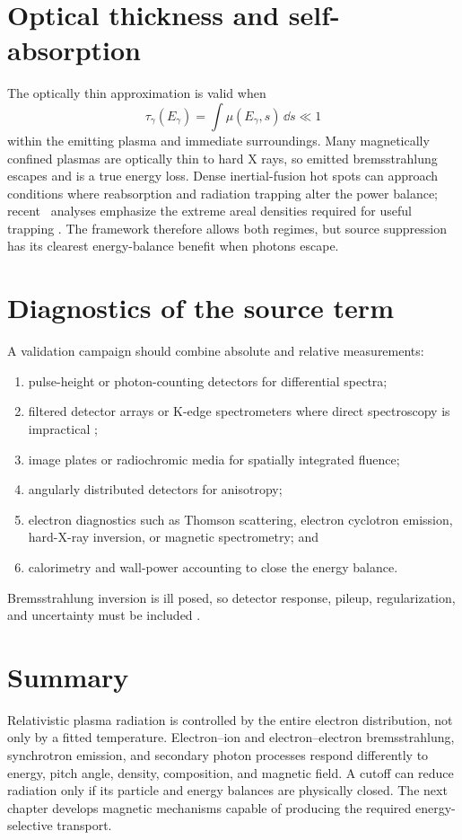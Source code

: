 \section{Optical thickness and self-absorption}

The optically thin approximation is valid when
\begin{equation}
\tau_\gamma(E_\gamma)=\int \mu(E_\gamma,s)\,\dd s\ll1
\end{equation}
within the emitting plasma and immediate surroundings. Many magnetically confined plasmas are optically thin to hard X rays, so emitted bremsstrahlung escapes and is a true energy loss. Dense inertial-fusion hot spots can approach conditions where reabsorption and radiation trapping alter the power balance; recent \pB \ analyses emphasize the extreme areal densities required for useful trapping \cite{ochs2025constraints}. The framework therefore allows both regimes, but source suppression has its clearest energy-balance benefit when photons escape.

\section{Diagnostics of the source term}

A validation campaign should combine absolute and relative measurements:
\begin{enumerate}
\item pulse-height or photon-counting detectors for differential spectra;
\item filtered detector arrays or K-edge spectrometers where direct spectroscopy is impractical \cite{chen2008};
\item image plates or radiochromic media for spatially integrated fluence;
\item angularly distributed detectors for anisotropy;
\item electron diagnostics such as Thomson scattering, electron cyclotron emission, hard-X-ray inversion, or magnetic spectrometry; and
\item calorimetry and wall-power accounting to close the energy balance.
\end{enumerate}
Bremsstrahlung inversion is ill posed, so detector response, pileup, regularization, and uncertainty must be included \cite{voss1992,kontar2011,swanson2018,meadowcroft2012}.

\section{Summary}

Relativistic plasma radiation is controlled by the entire electron distribution, not only by a fitted temperature. Electron--ion and electron--electron bremsstrahlung, synchrotron emission, and secondary photon processes respond differently to energy, pitch angle, density, composition, and magnetic field. A cutoff can reduce radiation only if its particle and energy balances are physically closed. The next chapter develops magnetic mechanisms capable of producing the required energy-selective transport.
